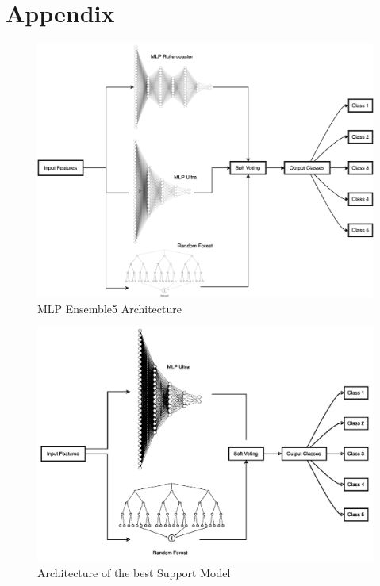 \section{Appendix}



\begin{figure}[H]
    \centering
    \includegraphics[width=\columnwidth]{./images/MLP_Ensemble5.png}
    \caption{MLP Ensemble5 Architecture}
    \label{fig:MLP_Ensemble5}
\end{figure}

\begin{figure}[H]
    \centering
    \includegraphics[width=\columnwidth]{../images/MLP_Ensamble2.png}
    \caption{Architecture of the best Support Model}
    \label{fig:MLP_Ensamble2}
\end{figure}